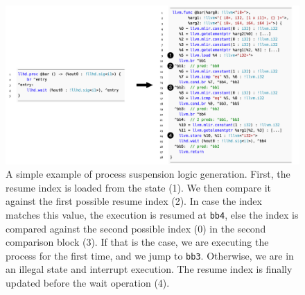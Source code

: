 \begin{figure}[ht]
    \centering
    \includegraphics[width=1.1\textwidth]{gfx/ProcConv.png}
    \caption[A simple example of process suspension logic generation.]{A simple example of process suspension logic generation. First, the resume index is loaded from the state (1). We then compare it against the first possible resume index (2). In case the index matches this value, the execution is resumed at \texttt{bb4}, else the index is compared against the second possible index (\ie $0$) in the second comparison block (3). If that is the case, we are executing the process for the first time, and we jump to \texttt{bb3}. Otherwise, we are in an illegal state and interrupt execution. The resume index is finally updated before the wait operation (4).}
    \label{fig:proclow}
\end{figure}


